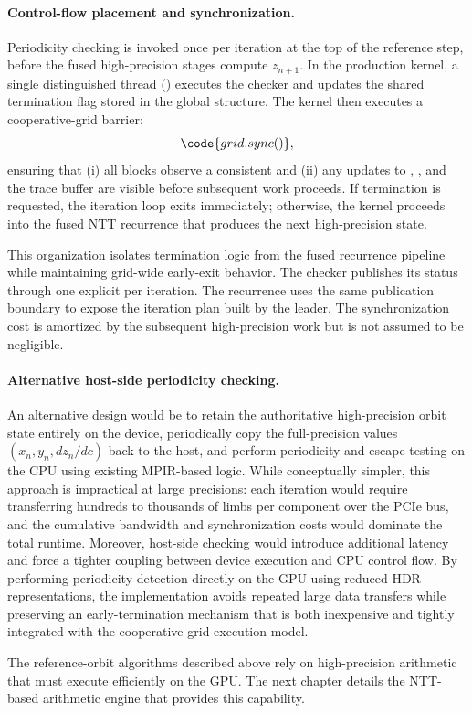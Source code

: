 \paragraph{Control-flow placement and synchronization.}
Periodicity checking is invoked once per iteration at the top of the reference
step, before the fused high-precision stages compute
\(z_{n+1}\). In the production kernel, a single distinguished thread
() executes the checker and updates the shared
termination flag stored in the global  structure. The kernel
then executes a cooperative-grid barrier:
\begin{equation}
  \code{grid.sync()},
  \label{eq:grid-sync}
\end{equation}
ensuring that (i) all blocks observe a consistent  and
(ii) any updates to , , and the trace buffer are
visible before subsequent work proceeds. If termination is requested, the
iteration loop exits immediately; otherwise, the kernel proceeds into the
fused NTT recurrence that produces the next high-precision state.

This organization isolates termination logic from the fused recurrence pipeline
while maintaining grid-wide early-exit behavior.  The checker publishes its
status through one explicit  per iteration.  The recurrence uses the same publication
boundary to expose the iteration plan built by the leader.  The synchronization
cost is amortized by the subsequent high-precision work but is not assumed to be
negligible.

\paragraph{Alternative host-side periodicity checking.}
An alternative design would be to retain the authoritative high-precision orbit
state entirely on the device, periodically copy the full-precision values
\((x_n, y_n, dz_n/dc)\) back to the host, and perform periodicity and escape
testing on the CPU using existing MPIR-based logic. While conceptually simpler,
this approach is impractical at large precisions: each iteration would require
transferring hundreds to thousands of limbs per component over the PCIe bus,
and the cumulative bandwidth and synchronization costs would dominate the total
runtime. Moreover, host-side checking would introduce additional latency and
force a tighter coupling between device execution and CPU control flow. By
performing periodicity detection directly on the GPU using reduced HDR
representations, the implementation avoids repeated large data transfers while
preserving an early-termination mechanism that is both inexpensive and tightly
integrated with the cooperative-grid execution model.

The reference-orbit algorithms described above rely on high-precision arithmetic
that must execute efficiently on the GPU.  The next chapter details the
NTT-based arithmetic engine that provides this capability.

